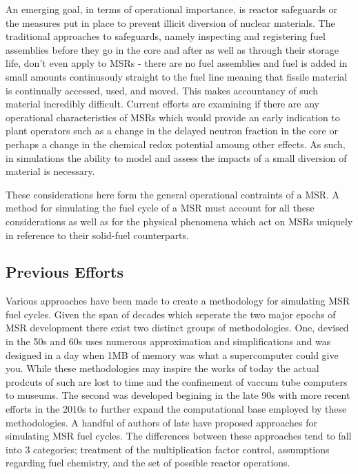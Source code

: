 An emerging goal, in terms of operational importance, is reactor safeguards or
the measures put in place to prevent illicit diversion of nuclear materials.
The traditional approaches to safeguards, namely inspecting and registering
fuel assemblies before they go in the core and after as well as through their
storage life, don't even apply to MSRs - there are no fuel assemblies and fuel
is added in small amounts continusouly straight to the fuel line meaning that
fissile material is continually accessed, used, and moved. This makes
accountancy of such material incredibly difficult. Current efforts are examining
if there are any operational characteristics of MSRs which would provide an
early indication to plant operators such as a change in the delayed neutron
fraction in the core or perhaps a change in the chemical redox potential amoung
other effects. As such, in simulations the ability to model and assess the
impacts of a small diversion of material is necessary.

These considerations here form the general operational contraints of a MSR. A
method for simulating the fuel cycle of a MSR must account for all these
considerations as well as for the physical phenomena which act on MSRs
uniquely in reference to their solid-fuel counterparts.

\subsection{Previous Efforts}\label{ssec:efforts}

Various approaches have been made to create a methodology for simulating MSR
fuel cycles. Given the span of decades which seperate the two major epochs of
MSR development there exist two distinct groups of methodologies. One, devised
in the 50s and 60s uses numerous approximation and simplifications and was
designed in a day when 1MB of memory was what a supercomputer could give you.
While these methodologies may inspire the works of today the actual prodcuts of
such are lost to time and the confinement of vaccum tube computers to museums.
The second was developed begining in the late 90s with more recent efforts in
the 2010s to further expand the computational base employed by these
methodologies. A handful of authors of late have proposed approaches for
simulating MSR fuel cycles. The differences between these approaches tend to
fall into 3 categories; treatment of the multiplication factor control,
assumptions regarding fuel chemistry, and the set of possible reactor
operations.

